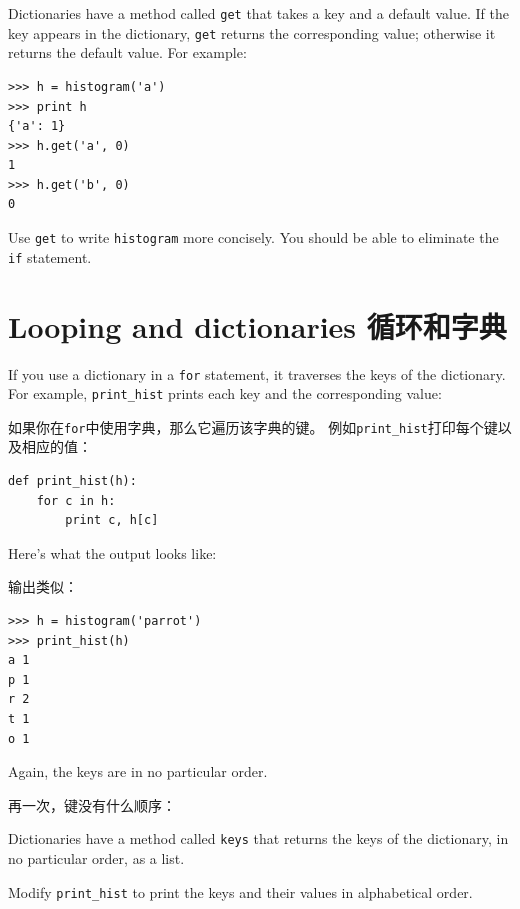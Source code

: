 \documentclass[10pt]{book}
\begin{document}
\begin{CJK}{UTF8}{gbsn}
\begin{exercise}

Dictionaries have a method called {\tt get} that takes a key
and a default value.  If the key appears in the dictionary,
{\tt get} returns the corresponding value; otherwise it returns
the default value.  For example:

\begin{verbatim}
>>> h = histogram('a')
>>> print h
{'a': 1}
>>> h.get('a', 0)
1
>>> h.get('b', 0)
0
\end{verbatim}
%
Use {\tt get} to write {\tt histogram} more concisely.  You
should be able to eliminate the {\tt if} statement.
\end{exercise}


\section{Looping and dictionaries 循环和字典}

If you use a dictionary in a {\tt for} statement, it traverses
the keys of the dictionary.  For example, \verb"print_hist"
prints each key and the corresponding value:

如果你在{\tt for}中使用字典，那么它遍历该字典的键。
例如\verb"print_hist"打印每个键以及相应的值：

\begin{verbatim}
def print_hist(h):
    for c in h:
        print c, h[c]
\end{verbatim}
%
Here's what the output looks like:

输出类似：

\begin{verbatim}
>>> h = histogram('parrot')
>>> print_hist(h)
a 1
p 1
r 2
t 1
o 1
\end{verbatim}
%
Again, the keys are in no particular order.

再一次，键没有什么顺序：

\begin{exercise}

Dictionaries have a method called {\tt keys} that returns
the keys of the dictionary, in no particular order, as a list.

Modify \verb"print_hist" to print the keys and their values
in alphabetical order.
\end{exercise}




\end{CJK}
\end{document}
